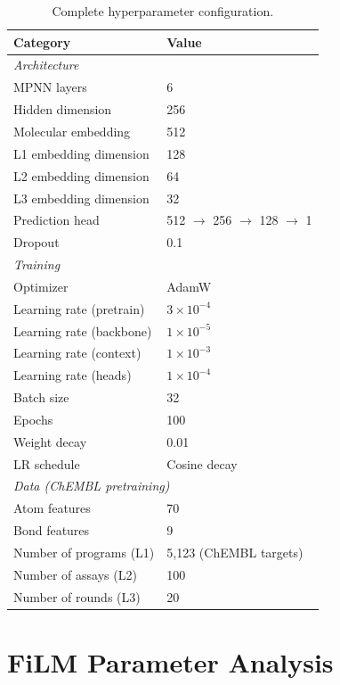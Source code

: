\documentclass{article}
\begin{document}
\begin{table}[h]
\caption{Complete hyperparameter configuration.}
\label{tab:hyperparams}
\centering
\small
\begin{tabular}{@{}ll@{}}
\toprule
\textbf{Category} & \textbf{Value} \\
\midrule
\multicolumn{2}{l}{\textit{Architecture}} \\
\quad MPNN layers & 6 \\
\quad Hidden dimension & 256 \\
\quad Molecular embedding & 512 \\
\quad L1 embedding dimension & 128 \\
\quad L2 embedding dimension & 64 \\
\quad L3 embedding dimension & 32 \\
\quad Prediction head & 512 $\rightarrow$ 256 $\rightarrow$ 128 $\rightarrow$ 1 \\
\quad Dropout & 0.1 \\
\midrule
\multicolumn{2}{l}{\textit{Training}} \\
\quad Optimizer & AdamW \\
\quad Learning rate (pretrain) & $3 \times 10^{-4}$ \\
\quad Learning rate (backbone) & $1 \times 10^{-5}$ \\
\quad Learning rate (context) & $1 \times 10^{-3}$ \\
\quad Learning rate (heads) & $1 \times 10^{-4}$ \\
\quad Batch size & 32 \\
\quad Epochs & 100 \\
\quad Weight decay & 0.01 \\
\quad LR schedule & Cosine decay \\
\midrule
\multicolumn{2}{l}{\textit{Data (ChEMBL pretraining)}} \\
\quad Atom features & 70 \\
\quad Bond features & 9 \\
\quad Number of programs (L1) & 5,123 (ChEMBL targets) \\
\quad Number of assays (L2) & 100 \\
\quad Number of rounds (L3) & 20 \\
\bottomrule
\end{tabular}
\end{table}

\section{FiLM Parameter Analysis}
\label{app:film}
\end{document}
